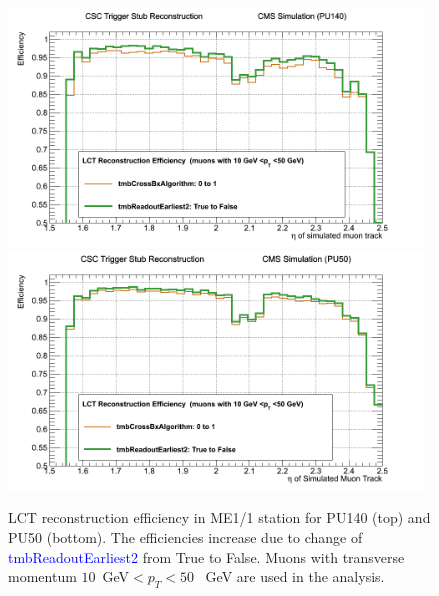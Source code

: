 \begin{figure}[h!]
\includegraphics[width=0.98\textwidth]{figures/PU140_Improv_from8_to_9.png}
\includegraphics[width=0.98\textwidth]{figures/PU50_Improv_from8_to_9.png}
\caption{LCT reconstruction efficiency in ME1/1 station for PU140 (top) and PU50 (bottom). The efficiencies increase due to change of \textcolor{blue}{tmbReadoutEarliest2} from True to False. Muons with transverse momentum $10$~GeV$<p_T<50$~ GeV are used in the analysis.}
\label{fig:From8to9}
\end{figure}
